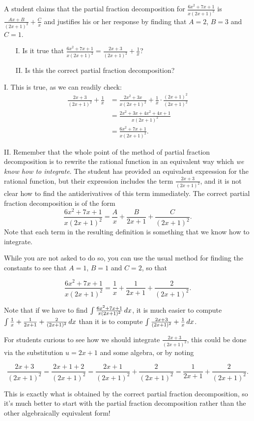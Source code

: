 \documentclass[noauthor, handout]{ximera}
\begin{document}
\begin{problem}
A student claims that the partial fraction decomposition for $\frac{6x^2+7x+1}{x(2x+1)^2}$ is $\frac{Ax+B}{(2x+1)^2}+\frac{C}{x}$ and justifies his or her response by finding that $A=2$, $B=3$ and $C=1$.

\begin{itemize}
\item[I.] Is it true that $\frac{6x^2+7x+1}{x(2x+1)^2} = \frac{2x+3}{(2x+1)^2}+\frac{1}{x}$?
\item[II.] Is this the correct partial fraction decomposition?
\end{itemize}
\end{problem}

\begin{freeResponse}
I. This is true, as we can readily check:
\begin{align*}
\frac{2x+3}{(2x+1)^2}+\frac{1}{x} &= \frac{2x^2+3x}{x(2x+1)^2} + \frac{1}{x} \cdot \frac{(2x+1)^2}{(2x+1)^2} \\
&= \frac{2x^2+3x+4x^2+4x+1}{x(2x+1)^2} \\
&=\frac{6x^2+7x+1}{x(2x+1)^2}.
\end{align*}

II. Remember that the whole point of the method of partial fraction decomposition is to rewrite the rational function in an equivalent way which \emph{we know how to integrate}. The student has provided an equivalent expression for the rational function, but their expression includes the term  $\frac{2x+3}{(2x+1)^2}$, and it is not clear how to find the antiderivatives of this term immediately. The correct partial fraction decomposition is of the form
$$
\frac{6x^2+7x+1}{x(2x+1)^2} = \frac{A}{x} + \frac{B}{2x+1} + \frac{C}{(2x+1)^2}.
$$
Note that each term in the resulting definition is something that we know how to integrate. 

While you are not asked to do so, you can use the usual method for finding the constants to see that $A=1$, $B=1$ and $C=2$, so that

\[
\frac{6x^2+7x+1}{x(2x+1)^2} = \frac{1}{x} + \frac{1}{2x+1} + \frac{2}{(2x+1)^2}.
\]

Note that if we have to find $\int \frac{6x^2+7x+1}{x(2x+1)^2} \mathop{}\!d x$, it is much easier to compute $\int \frac{1}{x} + \frac{1}{2x+1} + \frac{2}{(2x+1)^2} \mathop{}\!d x$ than it is to compute $\int \frac{2x+3}{(2x+1)^2}+\frac{1}{x} \mathop{}\!d x$.

\begin{remark}
For students curious to see how we should integrate $\frac{2x+3}{(2x+1)^2}$, this could be done via the substitution $u=2x+1$ and some algebra, or by noting

\[
\frac{2x+3}{(2x+1)^2} =\frac{2x+1+2}{(2x+1)^2}=\frac{2x+1}{(2x+1)^2}+\frac{2}{(2x+1)^2} = \frac{1}{2x+1}+\frac{2}{(2x+1)^2}.
\]

This is exactly what is obtained by the correct partial fraction decomposition, so it's much better to start with the partial fraction decomposition rather than the other algebraically equivalent form!

\end{remark}
\end{freeResponse}
\end{document}
